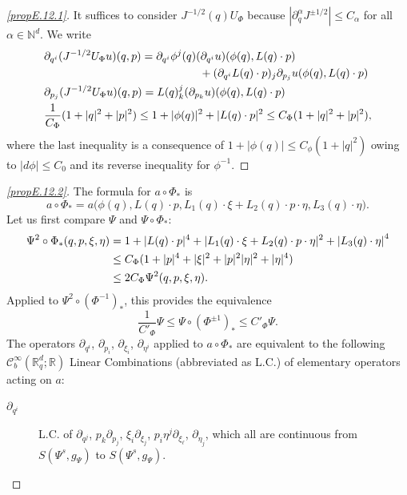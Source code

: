 \documentclass[AHL,Unicode,longabstracts]{cedram}
\newcommand{\R}{\mathbb{R}}
\newcommand{\N}{\mathbb{N}}
\newcommand{\clC}{\mathcal{C}}
\let\originalleft\left
\let\originalright\right
\renewcommand{\left}{\mathopen{}\mathclose\bgroup\originalleft}
\renewcommand{\right}{\aftergroup\egroup\originalright}
\begin{document}
\begin{proofc}
\begin{proof}[{\eqref{propE.12.1}}] 
It suffices to consider $J^{-1/2}(q)U_{\Phi}$ because $|\partial_{q}^{\alpha}J^{\pm 1/2}|\leq C_{\alpha}$ for all $\alpha\in \N^{d}$. We write
\begin{align*}
&
\partial_{q^{i}}(J^{-1/2}U_{\Phi}u)(q,p)=\partial_{q^{i}}\phi^{j}(q)(\partial_{q^{i}}u)(\phi(q),L(q)\cdot p)
\\ &\mkern250mu +(\partial_{q^{i}}L(q)\cdot p)_{j}\partial_{p_{j}}u(\phi(q),L(q)\cdot p)
\\
&
\partial_{p_{j}}(J^{-1/2}U_{\Phi}u)(q,p)=L(q)^{j}_{k}(\partial_{p_{k}}u)(\phi(q),L(q)\cdot p)\\
&\frac{1}{C_{\Phi}}(1+|q|^{2}+|p|^{2})\leq 1+|\phi(q)|^{2}+|L(q)\cdot p|^{2}\leq C_{\Phi}(1+|q|^{2}+|p|^{2}),
\end{align*}
where the last inequality is a consequence of $1+|\phi(q)|\leq C_{\phi}(1+|q|^{2})$ owing to $|d\phi|\leq C_{0}$ and its reverse inequality for $\phi^{-1}$.
\let\qed\relax
\end{proof}
\begin{proof}[{\eqref{propE.12.2}}]
The formula for $a\circ \Phi_{*}$ is
\[
a\circ\Phi_{*}=a\bigl(\phi(q),L(q)\cdot p, L_{1}(q)\cdot\xi+L_{2}(q)\cdot p\cdot\eta,L_{3}(q)\cdot \eta\bigr).
\]
Let us first compare $\Psi$ and $\Psi\circ \Phi_{*}$:
\begin{align*}
\Psi^{2}\circ \Phi_{*}(q,p,\xi,\eta)&=1+|L(q)\cdot p|^{4}+|L_{1}(q)\cdot \xi+L_{2}(q)\cdot p\cdot \eta|^{2} +\left|L_{3}(q)\cdot\eta\right|^{4}
\\
&\leq C_{\Phi}(1+|p|^{4}+|\xi|^{2}+|p|^{2}|\eta|^{2}+|\eta|^{4})\\
&\leq 2C_{\Phi}\Psi^{2}(q,p,\xi,\eta).
\end{align*}
Applied to $\Psi^{2}\circ(\Phi^{-1})_{*}$, this provides the equivalence
\[
\frac{1}{C'_{\Phi}}\Psi\leq \Psi\circ (\Phi^{\pm 1})_{*}\leq C'_{\Phi}\Psi.
\]
The operators $\partial_{q^{i}}$,  $\partial_{p_{i}}$, $\partial_{\xi_{i}}$, $\partial_{\eta^{i}}$ applied to $a\circ \Phi_{*}$ are equivalent to the following $\clC^{\infty}_{b}(\R_{q}^{d};\R)$ Linear Combinations (abbreviated as L.C.) of elementary operators acting on $a$:
\begin{description}
\item[$\partial_{q^{i}}$] L.C. of $\partial_{q^{j}}$, $p_{k}\partial_{p_{j}}$, $\xi_i\partial_{\xi_{j}}$, $p_{i}\eta^{j}\partial_{\xi_{\ell}}$, $\partial_{\eta_{j}}$, which all are continuous from $S(\Psi^{s},g_{\Psi})$ to $S(\Psi^{s},g_{\Psi})$.

\end{description}
\end{proof}
\end{proofc}
\end{document}
